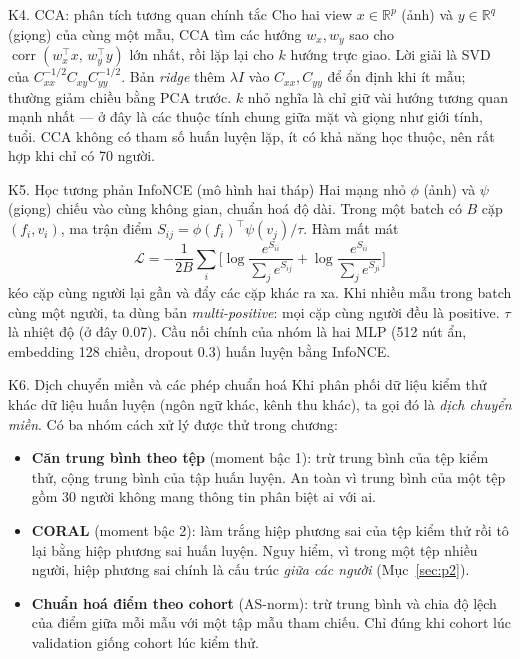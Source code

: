 \documentclass[11pt,a4paper,oneside]{report}
\begin{document}
\begin{knowledge}{K4. CCA: phân tích tương quan chính tắc}
Cho hai view $x\in\mathbb{R}^{p}$ (ảnh) và $y\in\mathbb{R}^{q}$ (giọng) của cùng một mẫu, CCA tìm các hướng $w_x,w_y$ sao cho $\operatorname{corr}(w_x^\top x,\,w_y^\top y)$ lớn nhất, rồi lặp lại cho $k$ hướng trực giao. Lời giải là SVD của $C_{xx}^{-1/2}C_{xy}C_{yy}^{-1/2}$. Bản \emph{ridge} thêm $\lambda I$ vào $C_{xx},C_{yy}$ để ổn định khi ít mẫu; thường giảm chiều bằng PCA trước. $k$ nhỏ nghĩa là chỉ giữ vài hướng tương quan mạnh nhất --- ở đây là các thuộc tính chung giữa mặt và giọng như giới tính, tuổi. CCA không có tham số huấn luyện lặp, ít có khả năng học thuộc, nên rất hợp khi chỉ có 70 người.
\end{knowledge}

\begin{knowledge}{K5. Học tương phản InfoNCE (mô hình hai tháp)}
Hai mạng nhỏ $\phi$ (ảnh) và $\psi$ (giọng) chiếu vào cùng không gian, chuẩn hoá độ dài. Trong một batch có $B$ cặp $(f_i,v_i)$, ma trận điểm $S_{ij}=\phi(f_i)^\top\psi(v_j)/\tau$. Hàm mất mát
\[
\mathcal{L}=-\frac{1}{2B}\sum_i\Big[\log\frac{e^{S_{ii}}}{\sum_j e^{S_{ij}}}+\log\frac{e^{S_{ii}}}{\sum_j e^{S_{ji}}}\Big]
\]
kéo cặp cùng người lại gần và đẩy các cặp khác ra xa. Khi nhiều mẫu trong batch cùng một người, ta dùng bản \emph{multi-positive}: mọi cặp cùng người đều là positive. $\tau$ là nhiệt độ (ở đây 0.07). Cầu nối chính của nhóm là hai MLP (512 nút ẩn, embedding 128 chiều, dropout 0.3) huấn luyện bằng InfoNCE.
\end{knowledge}

\begin{knowledge}{K6. Dịch chuyển miền và các phép chuẩn hoá}
Khi phân phối dữ liệu kiểm thử khác dữ liệu huấn luyện (ngôn ngữ khác, kênh thu khác), ta gọi đó là \emph{dịch chuyển miền}. Có ba nhóm cách xử lý được thử trong chương:
\begin{itemize}
\item \textbf{Căn trung bình theo tệp} (moment bậc 1): trừ trung bình của tệp kiểm thử, cộng trung bình của tập huấn luyện. An toàn vì trung bình của một tệp gồm 30 người không mang thông tin phân biệt ai với ai.
\item \textbf{CORAL} (moment bậc 2): làm trắng hiệp phương sai của tệp kiểm thử rồi tô lại bằng hiệp phương sai huấn luyện. Nguy hiểm, vì trong một tệp nhiều người, hiệp phương sai chính là cấu trúc \emph{giữa các người} (Mục~\ref{sec:p2}).
\item \textbf{Chuẩn hoá điểm theo cohort} (AS-norm): trừ trung bình và chia độ lệch của điểm giữa mỗi mẫu với một tập mẫu tham chiếu. Chỉ đúng khi cohort lúc validation giống cohort lúc kiểm thử.
\end{itemize}
\end{knowledge}
\end{document}

